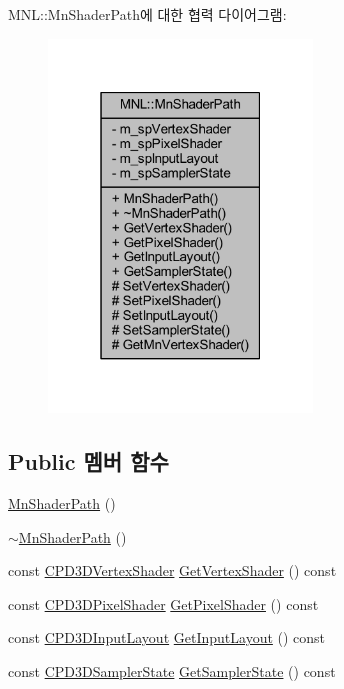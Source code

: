 M\+NL\+:\+:Mn\+Shader\+Path에 대한 협력 다이어그램\+:\nopagebreak
\begin{figure}[H]
\begin{center}
\leavevmode
\includegraphics[width=199pt]{class_m_n_l_1_1_mn_shader_path__coll__graph}
\end{center}
\end{figure}
\subsection*{Public 멤버 함수}
\begin{DoxyCompactItemize}
\item 
\hyperlink{class_m_n_l_1_1_mn_shader_path_a614a4d20f79a0188698467178d3ffc9f}{Mn\+Shader\+Path} ()
\item 
\hyperlink{class_m_n_l_1_1_mn_shader_path_a986217d4c3fa40967a5861b9d4c1da7d}{$\sim$\+Mn\+Shader\+Path} ()
\item 
const \hyperlink{namespace_m_n_l_a8036d713226061c4827b537821fbf79b}{C\+P\+D3\+D\+Vertex\+Shader} \hyperlink{class_m_n_l_1_1_mn_shader_path_a1f0838e1e8c46bd0dbd55969015e4c32}{Get\+Vertex\+Shader} () const
\item 
const \hyperlink{namespace_m_n_l_a4d6bd408e6e19137a03728583296f12a}{C\+P\+D3\+D\+Pixel\+Shader} \hyperlink{class_m_n_l_1_1_mn_shader_path_a6a34b780900e26df3ed3efbb87156797}{Get\+Pixel\+Shader} () const
\item 
const \hyperlink{namespace_m_n_l_aec7a2a132d6e72492d5feb5926d838dd}{C\+P\+D3\+D\+Input\+Layout} \hyperlink{class_m_n_l_1_1_mn_shader_path_a47377dfe73a0bcf67d7da79c7850c41a}{Get\+Input\+Layout} () const
\item 
const \hyperlink{namespace_m_n_l_ae0141196161ecb3d3055523077ca3aa1}{C\+P\+D3\+D\+Sampler\+State} \hyperlink{class_m_n_l_1_1_mn_shader_path_ac8a759eec45ec72e90f9d18dc823b3b0}{Get\+Sampler\+State} () const
\end{DoxyCompactItemize}
